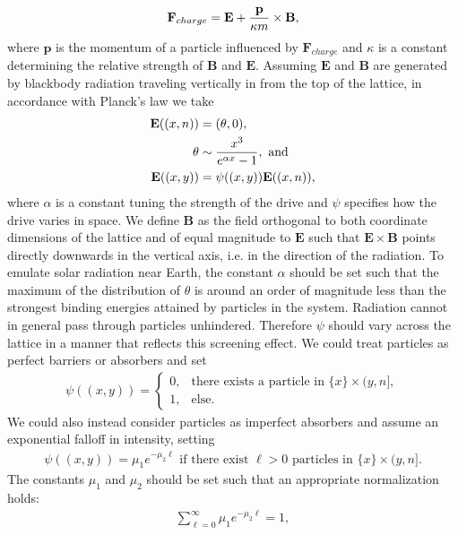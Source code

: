 \documentclass[12pt,letterpaper]{article}
\newcommand{\mb}{\mathbf}
\begin{document}
\begin{itemize}
\begin{align*}
\mb{F}_{charge} = \mb{E} + {\mb{p} \over \kappa m} \times \mb{B},
\end{align*}
where $\mb{p}$ is the momentum of a particle influenced by $\mb{F}_{charge}$ and $\kappa$ is a constant determining the relative strength of $\mb{B}$ and $\mb{E}$. Assuming $\mb{E}$ and $\mb{B}$ are generated by blackbody radiation traveling vertically in from the top of the lattice, in accordance with Planck's law we take
\begin{align*}
\mb{E}((x, n)) &= (\theta, 0), \\
\theta &\sim {x^{3} \over e^{\alpha x} - 1}, \textrm{ and} \\
\mb{E}((x, y)) &= \psi((x, y))\mb{E}((x, n)),
\end{align*}
where $\alpha$ is a constant tuning the strength of the drive and $\psi$ specifies how the drive varies in space. We define $\mb{B}$ as the field orthogonal to both coordinate dimensions of the lattice and of equal magnitude to $\mb{E}$ such that $\mb{E} \times \mb{B}$ points directly downwards in the vertical axis, i.e. in the direction of the radiation. To emulate solar radiation near Earth, the constant $\alpha$ should be set such that the maximum of the distribution of $\theta$ is around an order of magnitude less than the strongest binding energies attained by particles in the system. Radiation cannot in general pass through particles unhindered. Therefore $\psi$ should vary across the lattice in a manner that reflects this screening effect. We could treat particles as perfect barriers or absorbers and set
\begin{align*}
\psi((x, y)) = \begin{cases}
0, &\textrm{there exists a particle in } \{x\} \times (y, n], \\
1, &\textrm{else.}
\end{cases}
\end{align*}
We could also instead consider particles as imperfect absorbers and assume an exponential falloff in intensity, setting
\begin{align*}
\psi((x, y)) = \mu_{1}e^{-\mu_{2}\ell} \textrm{ if there exist } \ell > 0 \textrm{ particles in } \{x\} \times (y, n].
\end{align*}
The constants $\mu_{1}$ and $\mu_{2}$ should be set such that an appropriate normalization holds:
\begin{align*}
\sum_{\ell = 0}^{\infty}\mu_{1}e^{-\mu_{2}\ell} = 1,
\end{align*}

\end{itemize}
\end{document}
